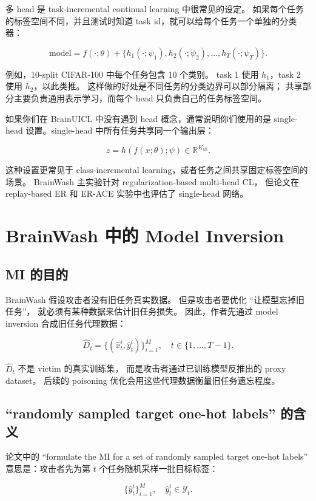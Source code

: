 \documentclass[11pt]{article}
\begin{document}
多 head 是 task-incremental continual learning 中很常见的设定。
如果每个任务的标签空间不同，并且测试时知道 task id，就可以给每个任务一个单独的分类器：

\[
\text{model}
=
f(\cdot;\theta)
+
\{h_1(\cdot;\psi_1),h_2(\cdot;\psi_2),\ldots,h_T(\cdot;\psi_T)\}.
\]

例如，10-split CIFAR-100 中每个任务包含 10 个类别。
task 1 使用 \(h_1\)，task 2 使用 \(h_2\)，以此类推。
这样做的好处是不同任务的分类边界可以部分隔离；
共享部分主要负责通用表示学习，而每个 head 只负责自己的任务标签空间。

如果你们在 BrainUICL 中没有遇到 head 概念，通常说明你们使用的是
single-head 设置。single-head 中所有任务共享同一个输出层：

\[
z
=
h(f(x;\theta);\psi)
\in \mathbb{R}^{K_{\mathrm{all}}}.
\]

这种设置更常见于 class-incremental learning，或者任务之间共享固定标签空间的场景。
BrainWash 主实验针对 regularization-based multi-head CL，
但论文在 replay-based ER 和 ER-ACE 实验中也评估了 single-head 网络。

\section{BrainWash 中的 Model Inversion}

\subsection{MI 的目的}

BrainWash 假设攻击者没有旧任务真实数据。
但是攻击者要优化 ``让模型忘掉旧任务''，
就必须有某种数据来估计旧任务损失。
因此，作者先通过 model inversion 合成旧任务代理数据：

\[
\hat{D}_t
=
\{(\hat{x}_t^i,\hat{y}_t^i)\}_{i=1}^{M},
\quad
t\in\{1,\ldots,T-1\}.
\]

\(\hat{D}_t\) 不是 victim 的真实训练集，
而是攻击者通过已训练模型反推出的 proxy dataset。
后续的 poisoning 优化会用这些代理数据衡量旧任务遗忘程度。

\subsection{``randomly sampled target one-hot labels'' 的含义}

论文中的 ``formulate the MI for a set of randomly sampled target one-hot labels''
意思是：攻击者先为第 \(t\) 个任务随机采样一批目标标签：

\[
\{\hat{y}_t^i\}_{i=1}^{M},
\quad
\hat{y}_t^i\in\mathcal{Y}_t.
\]
\end{document}
